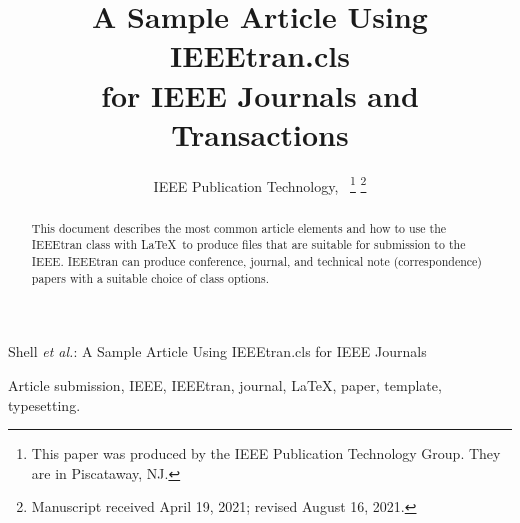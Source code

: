 \documentclass[lettersize,journal]{IEEEtran}
\begin{document}
\title{A Sample Article Using IEEEtran.cls\\ for IEEE Journals and Transactions}

\author{IEEE Publication Technology,~
\thanks{This paper was produced by the IEEE Publication Technology Group. They are in Piscataway, NJ.}%
\thanks{Manuscript received April 19, 2021; revised August 16, 2021.}}

%
{Shell \MakeLowercase{\textit{et al.}}: A Sample Article Using IEEEtran.cls for IEEE Journals}


\maketitle

\begin{abstract}
This document describes the most common article elements and how to use the IEEEtran class with \LaTeX \ to produce files that are suitable for submission to the IEEE.  IEEEtran can produce conference, journal, and technical note (correspondence) papers with a suitable choice of class options. 
\end{abstract}

\begin{IEEEkeywords}
Article submission, IEEE, IEEEtran, journal, \LaTeX, paper, template, typesetting.
\end{IEEEkeywords}
\end{document}
